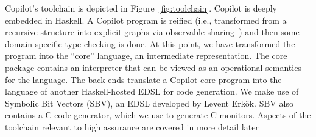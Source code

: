Copilot's toolchain is depicted in Figure~\ref{fig:toolchain}.  Copilot is deeply embedded in Haskell.  A Copilot program is
reified (i.e., transformed from a recursive structure into explicit graphs via
observable sharing~\cite{gill}) and then some domain-specific type-checking is
done.  At this point, we have transformed the program into the ``core''
language, an intermediate representation.  The core package contains
an  interpreter  that can be viewed as an operational semantics for
the language.   The back-ends translate a Copilot core program into the language of another
Haskell-hosted EDSL for code generation.  We make use of 
Symbolic Bit Vectors (SBV),  an EDSL developed by Levent Erk\"{o}k. 
SBV also contains a C-code generator, which we use to generate C
monitors.  Aspects of the toolchain relevant to high assurance are covered in more
detail later




